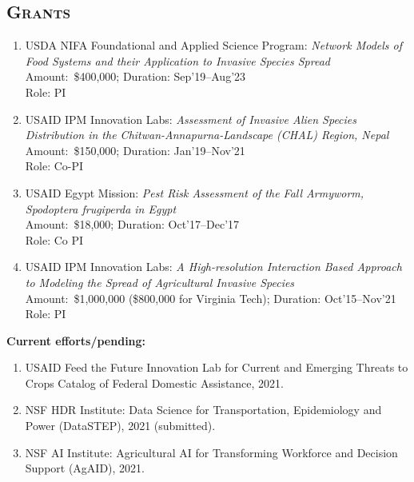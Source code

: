 \documentclass[margin,10pt]{res} %
\begin{document}
\begin{resume}
\section{\textnormal{\textsc{Grants}}}
\begin{enumerate}[$\circ$]
\item USDA NIFA Foundational and Applied Science Program: \emph{Network
Models of Food Systems and their Application to Invasive Species Spread} \\
Amount:~\$400,000; Duration: Sep'19--Aug'23\\
Role: PI
\item USAID IPM Innovation Labs: \emph{Assessment of Invasive Alien Species Distribution in the Chitwan-Annapurna-Landscape (CHAL) Region, Nepal}\\
Amount:~\$150,000; Duration: Jan'19--Nov'21\\
Role: Co-PI
\item USAID Egypt Mission: \emph{Pest Risk Assessment of the Fall Armyworm,
Spodoptera frugiperda in Egypt}\\ Amount:~\$18,000; Duration:
Oct'17--Dec'17\\ Role: Co PI
\item USAID IPM Innovation Labs: \emph{A High-resolution Interaction Based
Approach to Modeling the Spread of Agricultural Invasive Species}\\
Amount:~\$1,000,000 (\$800,000 for Virginia Tech); Duration: Oct'15--Nov'21\\
Role: PI
\end{enumerate}
\clearpage

\noindent
\textbf{Current efforts/pending:}\\
\begin{enumerate}[$\circ$]
\item USAID Feed the Future Innovation Lab for Current and Emerging Threats
to Crops Catalog of Federal Domestic Assistance, 2021.
\item NSF HDR Institute: Data Science for Transportation, Epidemiology and
Power (DataSTEP), 2021 (submitted).
\item NSF AI Institute: Agricultural AI for Transforming
Workforce and Decision Support (AgAID), 2021.
\end{enumerate}

\end{resume}
\end{document}
